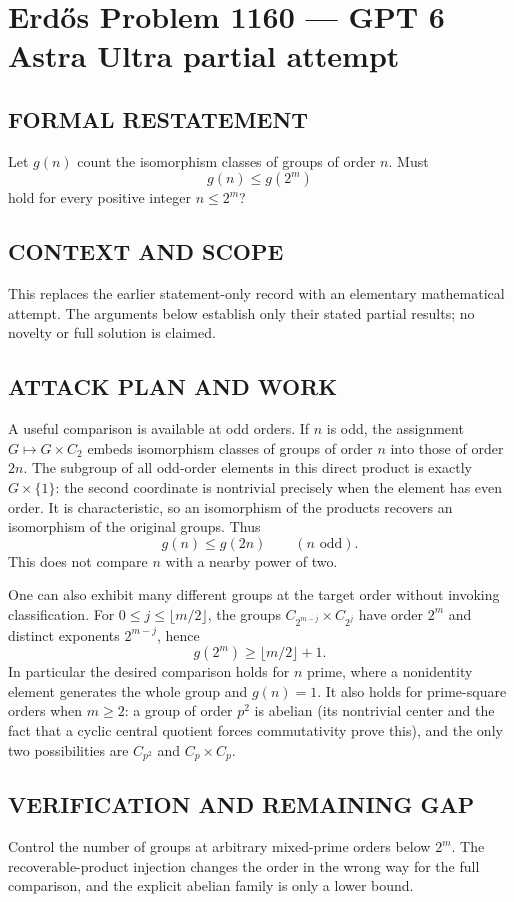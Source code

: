 \section*{Erd\H{o}s Problem 1160 --- GPT 6 Astra Ultra partial attempt}


\subsection*{FORMAL RESTATEMENT}
Let $g(n)$ count the isomorphism classes of groups of order $n$. Must
\[
g(n)\leq g(2^m)
\]
hold for every positive integer $n\leq2^m$?

\subsection*{CONTEXT AND SCOPE}
This replaces the earlier statement-only record with an elementary mathematical attempt. The arguments below establish only their stated partial results; no novelty or full solution is claimed.

\subsection*{ATTACK PLAN AND WORK}
A useful comparison is available at odd orders. If $n$ is odd, the assignment
$G\mapsto G\times C_2$ embeds isomorphism classes of groups of order $n$ into
those of order $2n$. The subgroup of all odd-order elements in this direct
product is exactly $G\times\{1\}$: the second coordinate is nontrivial precisely
when the element has even order. It is characteristic, so an isomorphism of
the products recovers an isomorphism of the original groups. Thus
\[g(n)\le g(2n)\qquad(n\text{ odd}).\tag{1}\]
This does not compare $n$ with a nearby power of two.

One can also exhibit many different groups at the target order without invoking
classification. For $0\le j\le\lfloor m/2\rfloor$, the groups
$C_{2^{m-j}}\times C_{2^j}$ have order $2^m$ and distinct exponents
$2^{m-j}$, hence
\[g(2^m)\ge\lfloor m/2\rfloor+1.\tag{2}\]
In particular the desired comparison holds for $n$ prime, where a nonidentity
element generates the whole group and $g(n)=1$. It also holds for prime-square
orders when $m\ge2$: a group of order $p^2$ is abelian (its nontrivial center and
the fact that a cyclic central quotient forces commutativity prove this), and
the only two possibilities are $C_{p^2}$ and $C_p\times C_p$.

\subsection*{VERIFICATION AND REMAINING GAP}
Control the number of groups at arbitrary mixed-prime orders below $2^m$.
The recoverable-product injection changes the order in the wrong way for the
full comparison, and the explicit abelian family is only a lower bound.


